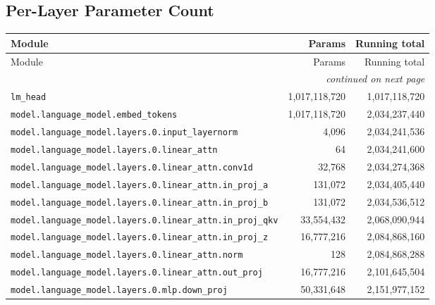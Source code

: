 \documentclass[10pt,a4paper]{article}
\theoremstyle{definition}
\begin{document}
\begin{appendices}
\section{Per-Layer Parameter Count}
\begin{longtable}{p{9.5cm}rr}
\toprule
Module & Params & Running total \\
\midrule
\endfirsthead
\toprule
Module & Params & Running total \\
\midrule
\endhead
\midrule \multicolumn{3}{r}{\textit{continued on next page}} \\
\endfoot
\bottomrule
\endlastfoot
\texttt{lm\_head} & 1,017,118,720 & 1,017,118,720 \\
\texttt{model.\allowbreak{}language\_model.\allowbreak{}embed\_tokens} & 1,017,118,720 & 2,034,237,440 \\
\texttt{model.\allowbreak{}language\_model.\allowbreak{}layers.\allowbreak{}0.\allowbreak{}input\_layernorm} & 4,096 & 2,034,241,536 \\
\texttt{model.\allowbreak{}language\_model.\allowbreak{}layers.\allowbreak{}0.\allowbreak{}linear\_attn} & 64 & 2,034,241,600 \\
\texttt{model.\allowbreak{}language\_model.\allowbreak{}layers.\allowbreak{}0.\allowbreak{}linear\_attn.\allowbreak{}conv1d} & 32,768 & 2,034,274,368 \\
\texttt{model.\allowbreak{}language\_model.\allowbreak{}layers.\allowbreak{}0.\allowbreak{}linear\_attn.\allowbreak{}in\_proj\_a} & 131,072 & 2,034,405,440 \\
\texttt{model.\allowbreak{}language\_model.\allowbreak{}layers.\allowbreak{}0.\allowbreak{}linear\_attn.\allowbreak{}in\_proj\_b} & 131,072 & 2,034,536,512 \\
\texttt{model.\allowbreak{}language\_model.\allowbreak{}layers.\allowbreak{}0.\allowbreak{}linear\_attn.\allowbreak{}in\_proj\_qkv} & 33,554,432 & 2,068,090,944 \\
\texttt{model.\allowbreak{}language\_model.\allowbreak{}layers.\allowbreak{}0.\allowbreak{}linear\_attn.\allowbreak{}in\_proj\_z} & 16,777,216 & 2,084,868,160 \\
\texttt{model.\allowbreak{}language\_model.\allowbreak{}layers.\allowbreak{}0.\allowbreak{}linear\_attn.\allowbreak{}norm} & 128 & 2,084,868,288 \\
\texttt{model.\allowbreak{}language\_model.\allowbreak{}layers.\allowbreak{}0.\allowbreak{}linear\_attn.\allowbreak{}out\_proj} & 16,777,216 & 2,101,645,504 \\
\texttt{model.\allowbreak{}language\_model.\allowbreak{}layers.\allowbreak{}0.\allowbreak{}mlp.\allowbreak{}down\_proj} & 50,331,648 & 2,151,977,152 \\

\end{longtable}
\end{appendices}
\end{document}
